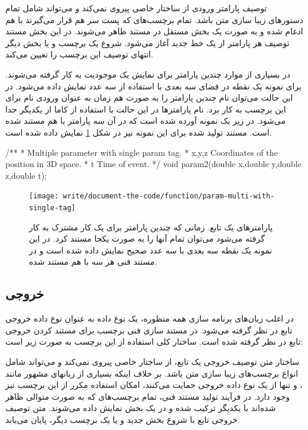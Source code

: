 توصیف پارامتر ورودی از ساختار خاصی پیروی نمی‌کند و می‌تواند شامل تمام دستورهای
زیبا سازی متن باشد.
تمام برچسب‌های  که پست سر هم قرار می‌گیرند با هم ادغام شده و به صورت یک 
بخش مستقل در مستند ظاهر می‌شوند.
در این بخش مستند توصیف هر پارامتر از یک خط جدید آغاز می‌شود.
شروع یک برچسب و یا بخش دیگر انتهای توصیف این برچسب را تعیین می‌کند.

در بسیاری از موارد چندین پارامتر برای نمایش یک موجودیت به کار گرفته می‌شوند.
برای نمونه یک نقطه در فضای سه بعدی با استفاده از سه عدد نمایش داده می‌شود.
در این حالت می‌توان نام چندین پارامتر را به صورت هم زمان به عنوان ورودی نام 
برای این برچسب به کار برد.
نام پارامترها در این حالت با استفاده از کاما از یکدیگر جدا می‌شود.
در زیر یک نمونه آورده شده است که در آن سه پارامتر با هم مستند شده است.
مستند تولید شده برای این نمونه نیز در شکل 
\ref{write/document-the-code/function/param-multi-with-single-tag} نمایش داده شده است.
\begin{C++}
/**
 * \brief Multiple parameter with single param tag.
 * \param x,y,z Coordinates of the position in 3D space.
 * \param t     Time of event.
 */
void param2(double x,double y,double z,double t);
\end{C++}

\begin{figure}
	\centering
	\texttt{[image: write/document-the-code/function/param-multi-with-single-tag]}
	\caption[پارامترهای یک تابع]{
		پارامترهای یک تابع. زمانی که چندین پارامتر برای یک کار مشترک به کار گرفته می‌شود
		می‌توان تمام آنها را به صورت یکجا مستند کرد. در این نمونه یک نقطه سه بعدی با سه 
		عدد صحیح نمایش داده شده است و در مستند فنی هر سه با هم مستند شده.
	}
	\label{write/document-the-code/function/param-multi-with-single-tag}
\end{figure}



\subsection{خروجی}

در اغلب زبان‌های برنامه سازی همه منظوره، یک نوع داده به عنوان نوع داده خروجی تابع
در نظر گرفته می‌شود.
در مستند سازی فنی برچسب  برای مستند کردن خروجی تابع در نظر گرفته شده است.
ساختار کلی استفاده از این برچسب به صورت زیر است:
\begin{C++}
\end{C++}

ساختار متن توصیف خروجی یک تابع، از ساختار خاصی پیروی نمی‌کند و می‌تواند شامل
انواع برچسب‌های زیبا سازی متن باشد.
بر خلاف اینکه بسیاری از زبانهای مشهور مانند ،  و  تنها از 
یک نوع داده خروجی حمایت می‌کنند، امکان استفاده مکرر از این برچسب نیز وجود دارد.
در فرآیند تولید مستند فنی، تمام برچسب‌های  که به صورت متوالی ظاهر شده‌اند
با یکدیگر ترکیب شده و در یک بخش نمایش داده می‌شوند.
متن توصیف خروجی تابع با شروع بخش جدید و یا یک برچسب دیگر، پایان می‌یابد.

